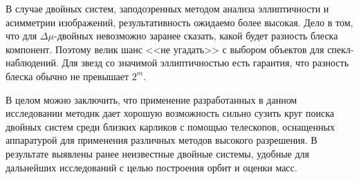 В случае двойных систем, заподозренных методом анализа эллиптичности и асимметрии изображений, результативность ожидаемо более высокая. Дело в том, что для $\Delta\mu$-двойных невозможно заранее сказать, какой будет разность блеска компонент. Поэтому велик шанс <<не угадать>> с выбором объектов для спекл-наблюдений. Для звезд со значимой эллиптичностью есть гарантия, что разность блеска обычно не превышает $2^m$. 

В целом можно заключить, что применение разработанных в данном исследовании методик дает хорошую возможность сильно сузить круг поиска двойных систем среди близких карликов с помощью телескопов, оснащенных аппаратурой для применения различных методов высокого разрешения. В результате выявлены ранее неизвестные двойные системы, удобные для дальнейших исследований с целью построения орбит и оценки масс.
